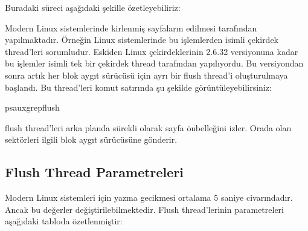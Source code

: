 \documentclass[a4paper,10pt,turkish]{sphinxmanual}
\begin{document}
\sphinxAtStartPar
Buradaki süreci aşağıdaki şekille özetleyebiliriz:


\sphinxAtStartPar
Modern Linux sistemlerinde kirlenmiş sayfaların  edilmesi  tarafından yapılmaktadır. Örneğin Linux sistemlerinde bu işlemlerden  isimli
çekirdek thread’leri sorumludur. Eskiden Linux çekirdeklerinin 2.6.32 versiyonuna kadar bu
işlemler  isimli tek bir çekirdek thread tarafından yapılıyordu. Bu versiyondan sonra
artık her blok aygıt sürücüsü için ayrı bir flush thread’i oluşturulmaya başlandı. Bu thread’leri
komut satırında şu şekilde görüntüleyebilirsiniz:

\begin{sphinxVerbatim}[commandchars=\\\{\}]
\PYGZdl{}ps\PYGZhy{}auxgrepflush
\end{sphinxVerbatim}

\sphinxAtStartPar
flush thread’leri arka planda sürekli olarak sayfa önbelleğini izler. Orada 
olan sektörleri ilgili blok aygıt sürücüsüne gönderir.


\subsection{Flush Thread Parametreleri}
\label{\detokenize{filesystem1:flush-thread-parametreleri}}
\sphinxAtStartPar
Modern Linux sistemleri için yazma gecikmesi ortalama 5 saniye civarındadır. Ancak bu değerler
değiştirilebilmektedir. Flush thread’lerinin parametreleri aşağıdaki tabloda özetlenmiştir:
\end{document}
